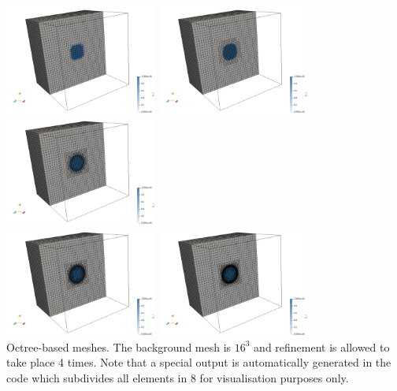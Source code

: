 \newpage
\begin{center}
\includegraphics[width=5cm]{images/stokes_sphere3D/aspect_amr_FS/C1_0}
\includegraphics[width=5cm]{images/stokes_sphere3D/aspect_amr_FS/C1_1}
\includegraphics[width=5cm]{images/stokes_sphere3D/aspect_amr_FS/C1_2}\\
\includegraphics[width=5cm]{images/stokes_sphere3D/aspect_amr_FS/C1_3}
\includegraphics[width=5cm]{images/stokes_sphere3D/aspect_amr_FS/C1_4}\\
{\captionfont Octree-based \aspect meshes. The background mesh is $16^3$ and refinement is allowed to take place 4 times.
Note that a special output is automatically generated in the code which subdivides all elements in 8 for 
visualisation purposes only.}
\end{center}


